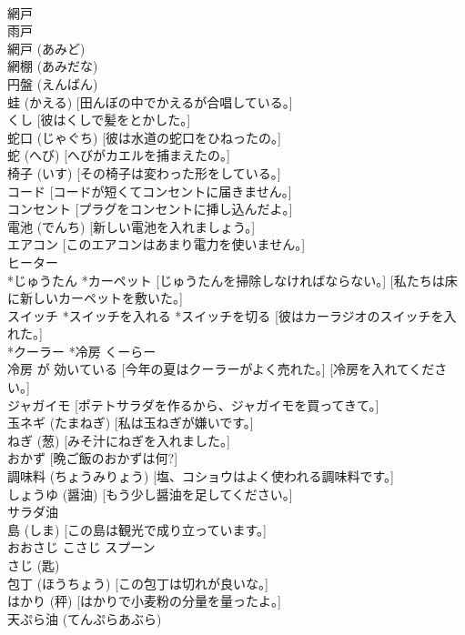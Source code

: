 \documentclass[8pt]{extreport}
\begin{document}
\begin{CJK}{UTF8}{min}
\\	網戸 
\\	雨戸
\\	網戸 (あみど)
\\	網棚 (あみだな)
\\	円盤 (えんばん)
\\	蛙 (かえる) [田んぼの中でかえるが合唱している。]
\\	くし [彼はくしで髪をとかした。]
\\	蛇口 (じゃぐち) [彼は水道の蛇口をひねったの。]
\\	蛇 (へび) [へびがカエルを捕まえたの。]
\\	椅子 (いす) [その椅子は変わった形をしている。]
\\	コード [コードが短くてコンセントに届きません。]
\\	コンセント [プラグをコンセントに挿し込んだよ。]
\\	電池 (でんち) [新しい電池を入れましょう。]
\\	エアコン [このエアコンはあまり電力を使いません。]
\\	ヒーター
\\	*じゅうたん *カーペット [じゅうたんを掃除しなければならない。] [私たちは床に新しいカーペットを敷いた。]
\\	スイッチ *スイッチを入れる *スイッチを切る [彼はカーラジオのスイッチを入れた。]
\\	*クーラー *冷房 くーらー 
\\	冷房 が 効いている [今年の夏はクーラーがよく売れた。] [冷房を入れてください。]
\\	ジャガイモ [ポテトサラダを作るから、ジャガイモを買ってきて。]
\\	玉ネギ (たまねぎ) [私は玉ねぎが嫌いです。]
\\	ねぎ (葱) [みそ汁にねぎを入れました。]
\\	おかず [晩ご飯のおかずは何?]
\\	調味料 (ちょうみりょう) [塩、コショウはよく使われる調味料です。]
\\	しょうゆ (醤油) [もう少し醤油を足してください。]
\\	サラダ油
\\	島 (しま) [この島は観光で成り立っています。]
\\	おおさじ こさじ スプーン
\\	さじ (匙)
\\	包丁 (ほうちょう) [この包丁は切れが良いな。]
\\	はかり (秤) [はかりで小麦粉の分量を量ったよ。]
\\	天ぷら油 (てんぷらあぶら)

\end{CJK}
\end{document}
